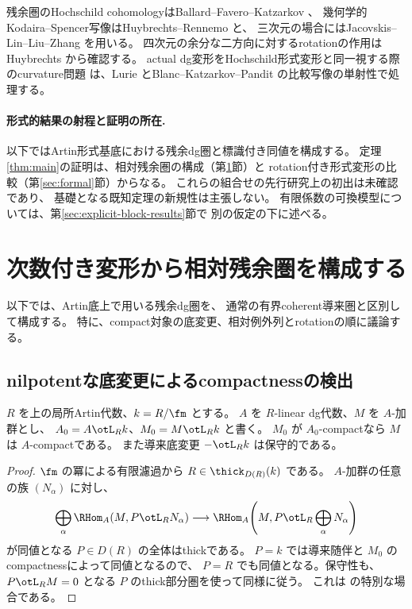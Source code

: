 残余圏のHochschild cohomologyはBallard--Favero--Katzarkov \cite{BFK}、
幾何学的Kodaira--Spencer写像はHuybrechts--Rennemo \cite{HR} と、
三次元の場合にはJacovskis--Lin--Liu--Zhang \cite{JLLZ} を用いる。
四次元の余分な二方向に対するrotationの作用は
Huybrechts \cite[Proposition 3.12]{Huy} から確認する。
actual dg変形をHochschild形式変形と同一視する際のcurvature問題
\cite{KL}は、Lurie \cite{Lurie} とBlanc--Katzarkov--Pandit
\cite{BKP} の比較写像の単射性で処理する。

\paragraph{形式的結果の射程と証明の所在.}
以下ではArtin形式基底における残余dg圏と標識付き同値を構成する。
定理\ref{thm:main}の証明は、相対残余圏の構成（第\ref{sec:relative}節）と
rotation付き形式変形の比較（第\ref{sec:formal}節）からなる。
これらの組合せの先行研究上の初出は未確認であり、
基礎となる既知定理の新規性は主張しない。
有限係数の可換模型については、第\ref{sec:explicit-block-results}節で
別の仮定の下に述べる。

\section{次数付き変形から相対残余圏を構成する}\label{sec:relative}

以下では、Artin底上で用いる残余dg圏を、
通常の有界coherent導来圏と区別して構成する。
特に、compact対象の底変更、相対例外列とrotationの順に議論する。

\subsection{nilpotentな底変更によるcompactnessの検出}

\begin{lemma}\label{lem:descent}
 \(R\) を上の局所Artin代数、\(k=R/\fm\) とする。
 \(A\) を \(R\)-linear dg代数、\(M\) を \(A\)-加群とし、
 \(A_0=A\otL_R k\)、\(M_0=M\otL_R k\) と書く。
 \(M_0\) が \(A_0\)-compactなら \(M\) は \(A\)-compactである。
 また導来底変更 \(-\otL_R k\) は保守的である。
\end{lemma}
\begin{proof}
 \(\fm\) の冪による有限濾過から
 \(R\in\thick_{D(R)}(k)\) である。
 \(A\)-加群の任意の族 \((N_\alpha)\) に対し、
 \[
 \bigoplus_\alpha\RHom_A(M,P\otL_RN_\alpha)
 \longrightarrow
 \RHom_A\!\left(M,P\otL_R\bigoplus_\alpha N_\alpha\right)
 \]
 が同値となる \(P\in D(R)\) の全体はthickである。
 \(P=k\) では導来随伴と \(M_0\) のcompactnessによって同値となるので、
 \(P=R\) でも同値となる。保守性も、
 \(P\otL_RM=0\) となる \(P\) のthick部分圏を使って同様に従う。
 これは \cite[Propositions 3.28, 3.35; Remark 3.29]{Mathew}
 の特別な場合である。
\end{proof}

